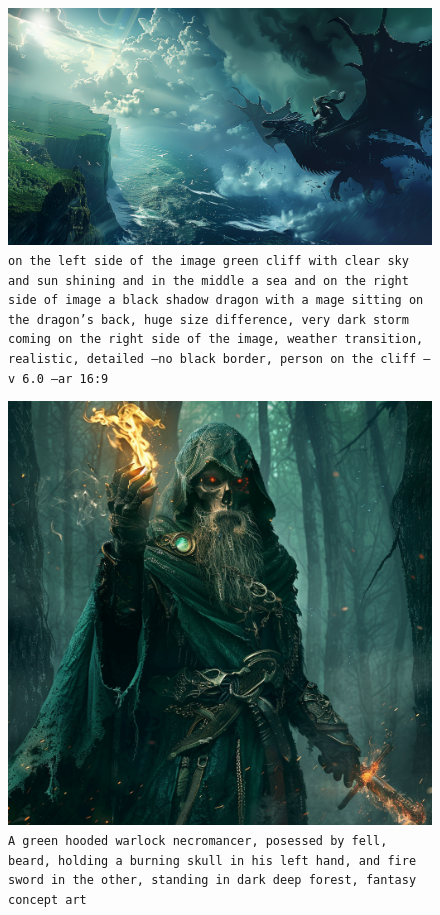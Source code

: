 \begin{figure}
    \centering
    \includegraphics[width=\textwidth]{resources/figures/background.png}
    \caption{\texttt{on the left side of the image green cliff with clear sky and sun shining and in the middle a sea and on the right side of image a black shadow dragon with a mage sitting on the dragon's back, huge size difference, very dark storm coming on the right side of the image, weather transition, realistic, detailed --no black border, person on the cliff --v 6.0 --ar 16:9}}
    \label{fig:background}
\end{figure}

\begin{figure}[h]
    \centering
    \includegraphics[width=\textwidth]{resources/figures/undeadSkeletNecro.png}
    \caption{\texttt{A green hooded warlock necromancer, posessed by fell, beard, holding a burning skull in his left hand, and fire sword in the other, standing in dark deep forest, fantasy concept art}}
    \label{fig:undeadSkeletNecro}
\end{figure}

